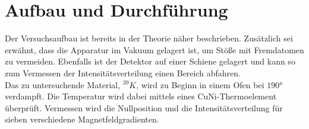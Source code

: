 \section{Aufbau und Durchführung}
\label{sec:Durchführung}
Der Versuchsaufbau ist bereits in der Theorie näher beschrieben.
Zusätzlich sei erwähnt, dass die Apparatur im Vakuum gelagert ist, um Stöße mit Fremdatomen zu vermeiden.
Ebenfalls ist der Detektor auf einer Schiene gelagert und kann so zum Vermessen der Intensitätsverteilung
einen Bereich abfahren.\\
Das zu untersuchende Material, $^{39}K$, wird zu Beginn in einem Ofen bei $190\si{\degree}$
verdampft. Die Temperatur wird dabei mittels eines CuNi-Thermoelement überprüft.
Vermessen wird die Nullposition und die Intensitätsverteilung für sieben verschiedene Magnetfeldgradienten.
